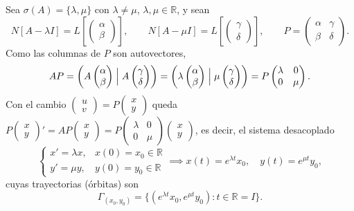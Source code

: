 Sea $\sigma(A) = \{ \lambda, \mu \}$ con $\lambda \neq \mu$, $\lambda, \mu \in \mathbb{R}$, y sean
\[
    N[A - \lambda I] = L\left[ \begin{pmatrix} \alpha \\ \beta \end{pmatrix} \right], \qquad
    N[A - \mu I] = L\left[ \begin{pmatrix} \gamma \\ \delta \end{pmatrix} \right], \qquad
    P = \begin{pmatrix} \alpha & \gamma \\ \beta & \delta \end{pmatrix}.
\]
Como las columnas de $P$ son autovectores,
\[
    A P = \left( A \begin{pmatrix} \alpha \\ \beta \end{pmatrix} \Bigm| A \begin{pmatrix} \gamma \\ \delta \end{pmatrix} \right)
    = \left( \lambda \begin{pmatrix} \alpha \\ \beta \end{pmatrix} \Bigm| \mu \begin{pmatrix} \gamma \\ \delta \end{pmatrix} \right)
    = P \begin{pmatrix} \lambda & 0 \\ 0 & \mu \end{pmatrix}.
\]
Con el cambio $\begin{pmatrix} u \\ v \end{pmatrix} = P \begin{pmatrix} x \\ y \end{pmatrix}$ queda $P \begin{pmatrix} x \\ y \end{pmatrix}' = A P \begin{pmatrix} x \\ y \end{pmatrix} = P \begin{pmatrix} \lambda & 0 \\ 0 & \mu \end{pmatrix} \begin{pmatrix} x \\ y \end{pmatrix}$, es decir, el sistema desacoplado
\[
    \begin{cases}
        x' = \lambda x, & x(0) = x_0 \in \mathbb{R} \\
        y' = \mu y, & y(0) = y_0 \in \mathbb{R}
    \end{cases}
    \implies
    x(t) = e^{\lambda t} x_0, \quad y(t) = e^{\mu t} y_0,
\]
cuyas trayectorias (órbitas) son
\[
    \Gamma_{(x_0, y_0)} = \{ (e^{\lambda t} x_0, e^{\mu t} y_0) : t \in \mathbb{R} = I \}.
\]

